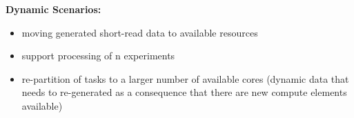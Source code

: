 \documentclass[]{article}
\begin{document}
\noindent
\textbf{Dynamic Scenarios:}
\begin{itemize}
	\item moving generated short-read data to available resources
	
	\item support processing of n experiments 

	\item re-partition of tasks to a larger number of available cores (dynamic data that needs to re-generated as a consequence that there are new compute elements available)

\end{itemize}



\end{document}
